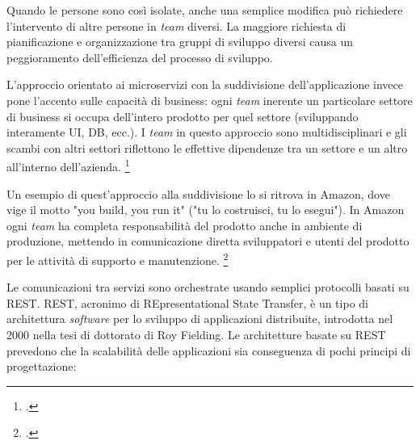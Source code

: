 Quando le persone sono così isolate, anche una semplice modifica può richiedere l'intervento di altre persone in \emph{team} diversi.
La maggiore richiesta di pianificazione e organizzazione tra gruppi di sviluppo diversi causa un peggioramento dell'efficienza del processo di sviluppo.

L'approccio orientato ai microservizi con la suddivisione dell'applicazione invece pone l'accento sulle capacità di business: ogni \emph{team} inerente un particolare settore di business si occupa dell'intero prodotto per quel settore (sviluppando interamente UI, DB, ecc.).
I \emph{team} in questo approccio sono multidisciplinari e gli scambi con altri settori riflettono le effettive dipendenze tra un settore e un altro all'interno dell'azienda.
\footcite{site:fowler-microservices}

Un esempio di quest'approccio alla suddivisione lo si ritrova in Amazon, dove vige il motto "you build, you run it" ("tu lo costruisci, tu lo esegui").
In Amazon ogni \emph{team} ha completa responsabilità del prodotto anche in ambiente di produzione, mettendo in comunicazione diretta sviluppatori e utenti del prodotto per le attività di supporto e manutenzione.
\footcite{site:amazon-microservices}

Le comunicazioni tra servizi sono orchestrate usando semplici protocolli basati su REST.
REST, acronimo di REpresentational State Transfer, è un tipo di architettura \emph{software} per lo sviluppo di applicazioni distribuite, introdotta nel 2000 nella tesi di dottorato di Roy Fielding.
Le architetture basate su REST prevedono che la scalabilità delle applicazioni sia conseguenza di pochi principi di progettazione:

